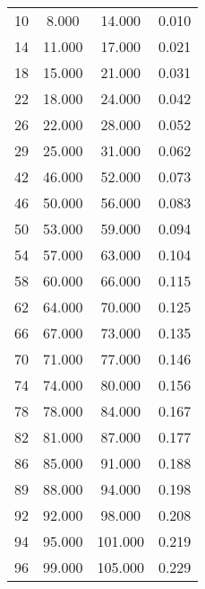 % 
\begin{tabular}{cccc}
  \hline
  \hline
10 & 8.000 & 14.000 & 0.010 \\ 
  14 & 11.000 & 17.000 & 0.021 \\ 
  18 & 15.000 & 21.000 & 0.031 \\ 
  22 & 18.000 & 24.000 & 0.042 \\ 
  26 & 22.000 & 28.000 & 0.052 \\ 
  29 & 25.000 & 31.000 & 0.062 \\ 
  42 & 46.000 & 52.000 & 0.073 \\ 
  46 & 50.000 & 56.000 & 0.083 \\ 
  50 & 53.000 & 59.000 & 0.094 \\ 
  54 & 57.000 & 63.000 & 0.104 \\ 
  58 & 60.000 & 66.000 & 0.115 \\ 
  62 & 64.000 & 70.000 & 0.125 \\ 
  66 & 67.000 & 73.000 & 0.135 \\ 
  70 & 71.000 & 77.000 & 0.146 \\ 
  74 & 74.000 & 80.000 & 0.156 \\ 
  78 & 78.000 & 84.000 & 0.167 \\ 
  82 & 81.000 & 87.000 & 0.177 \\ 
  86 & 85.000 & 91.000 & 0.188 \\ 
  89 & 88.000 & 94.000 & 0.198 \\ 
  92 & 92.000 & 98.000 & 0.208 \\ 
  94 & 95.000 & 101.000 & 0.219 \\ 
  96 & 99.000 & 105.000 & 0.229 \\ 
   \hline
\end{tabular}
